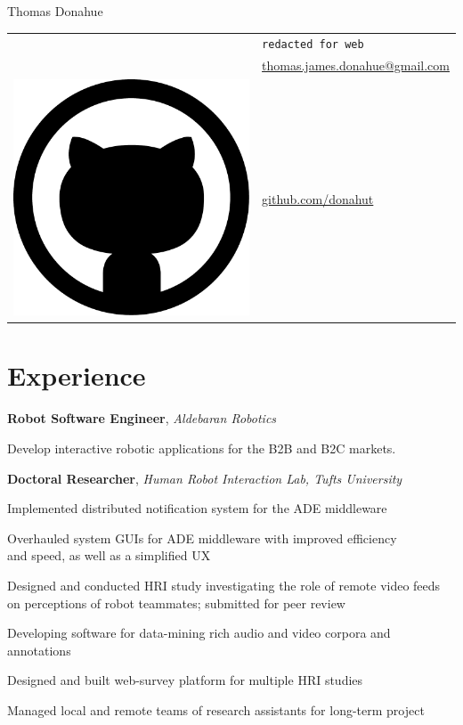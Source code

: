 \documentclass[10pt, letter]{article}
\newcommand*\github{\includegraphics[height=2ex]{github.pdf}}
\newcommand{\years}[1]{\marginnote{\footnotesize #1}}
\newenvironment{itemize*}{
  \begin{itemize}
    \setlength{\itemsep}{0pt}
    \setlength{\parskip}{-1pt}
    \setlength{\parsep}{-1pt}
  }{
  \end{itemize}
}
\begin{document}
\begin{minipage}[t]{0.55\textwidth}
  {\huge Thomas Donahue}
\end{minipage}
\begin{minipage}[t]{0.4\textwidth}
  \begin{tabular}[h]{ll}
    \Phone{}    & \texttt{redacted for web}\\
    \Envelope{} & \href{mailto:thomas.james.donahue@gmail.com}{thomas.james.donahue@gmail.com}\\    
    \github{}   & \href{http://www.github.com/donahut}{github.com/donahut}
  \end{tabular}
\end{minipage}

\section*{Experience}
\years{Mar 2014--}
\textbf{Robot Software Engineer}, \textsl{Aldebaran Robotics}
\begin{itemize*}
\item Develop interactive robotic applications for the B2B and B2C
  markets.
\end{itemize*}

\years{2012--2014}
\textbf{Doctoral Researcher}, \textsl{Human Robot Interaction Lab,
  Tufts University}
\begin{itemize*}
\item Implemented distributed notification system for the ADE middleware
\item Overhauled system GUIs for ADE middleware with improved
  efficiency\\ and speed, as well as a simplified UX 
\item Designed and conducted HRI study investigating the role of
  remote video feeds\\ on perceptions of robot teammates; submitted
  for peer review 
\item Developing software for data-mining rich audio and video corpora
  and annotations
\item Designed and built web-survey platform for multiple HRI studies
\item Managed local and remote teams of research
  assistants for long-term project
\end{itemize*}
\end{document}
